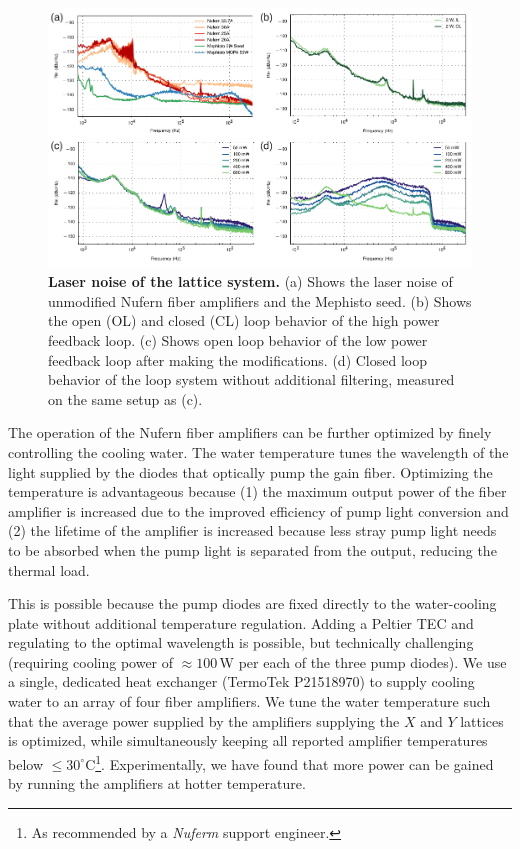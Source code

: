 \documentclass[twocolumn,aps,pra,showpacs,preprintnumbers,bibnotes]{revtex4-1}
\begin{document}
\begin{figure}
  \begin{center}
    \includegraphics{fig/fig3_combined.pdf}
    \caption{\textbf{Laser noise of the lattice system.} (a) Shows the laser noise of unmodified Nufern fiber amplifiers and the Mephisto seed. (b) Shows the open (OL) and closed (CL) loop behavior of the high power feedback loop. (c) Shows open loop behavior of the low power feedback loop after making the modifications. (d) Closed loop behavior of the loop system without additional filtering, measured on the same setup as (c).}\label{fig:noises}
  \end{center}
\end{figure}

The operation of the Nufern fiber amplifiers can be further optimized by finely controlling the cooling water.
The water temperature tunes the wavelength of the light supplied by the diodes that optically pump the gain fiber.
Optimizing the temperature is advantageous because (1) the maximum output power of the fiber amplifier is increased due to the improved efficiency of pump light conversion and (2) the lifetime of the amplifier is increased because less stray pump light needs to be absorbed when the pump light is separated from the output, reducing the thermal load.

This is possible because the pump diodes are fixed directly to the water-cooling plate without additional temperature regulation.
Adding a Peltier TEC and regulating to the optimal wavelength is possible, but technically challenging (requiring cooling power of $\approx100\,$W per each of the three pump diodes).
We use a single, dedicated heat exchanger (TermoTek P21518970) to supply cooling water to an array of four fiber amplifiers. 
We tune the water temperature such that the average power supplied by the amplifiers supplying the $X$ and $Y$ lattices is optimized, while simultaneously keeping all reported amplifier temperatures below $\leq 30^\circ\mathrm{C}$\footnote{As recommended by a \textit{Nuferm} support engineer.}.
Experimentally, we have found that more power can be gained by running the amplifiers at hotter temperature.
\end{document}

